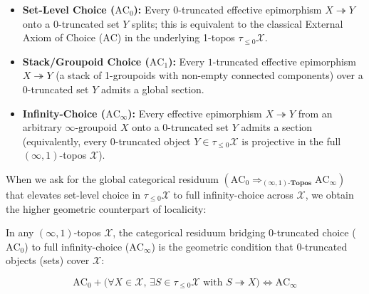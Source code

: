 \begin{itemize}

  \item \textbf{Set-Level Choice ($\mathrm{AC}_0$):} Every $0$-truncated effective epimorphism $X \twoheadrightarrow Y$ onto a $0$-truncated set $Y$ splits; this is equivalent to the classical External Axiom of Choice ($\mathrm{AC}$) in the underlying 1-topos $\tau_{\le 0}\mathcal{X}$.

  \item \textbf{Stack/Groupoid Choice ($\mathrm{AC}_1$):} Every $1$-truncated effective epimorphism $X \twoheadrightarrow Y$ (a stack of 1-groupoids with non-empty connected components) over a $0$-truncated set $Y$ admits a global section.

  \item \textbf{Infinity-Choice ($\mathrm{AC}_\infty$):} Every effective epimorphism $X \twoheadrightarrow Y$ from an arbitrary $\infty$-groupoid $X$ onto a $0$-truncated set $Y$ admits a section (equivalently, every $0$-truncated object $Y \in \tau_{\le 0}\mathcal{X}$ is projective in the full $(\infty, 1)$-topos $\mathcal{X}$).

\end{itemize}

When we ask for the global categorical residuum $(\mathrm{AC}_0 \Rightarrow_{(\infty,1)\text{-}\mathbf{Topos}} \mathrm{AC}_\infty)$ that elevates set-level choice in $\tau_{\le 0}\mathcal{X}$ to full infinity-choice across $\mathcal{X}$, we obtain the higher geometric counterpart of localicity:

\begin{theorem}\label{thm:global-inf-choice}%
%

In any $(\infty, 1)$-topos $\mathcal{X}$, the categorical residuum bridging $0$-truncated choice ($\mathrm{AC}_0$) to full infinity-choice ($\mathrm{AC}_\infty$) is the geometric condition that $0$-truncated objects (sets) cover $\mathcal{X}$:

\[
  \mathrm{AC}_0 + \bigl(\forall X \in \mathcal{X},\, \exists S \in \tau_{\le 0}\mathcal{X} \text{ with } S \twoheadrightarrow X\bigr) \iff \mathrm{AC}_\infty
\]

\end{theorem}

